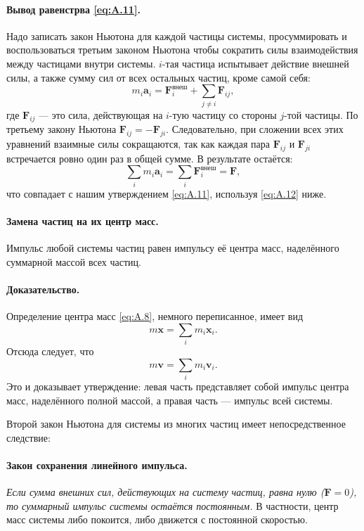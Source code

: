 \paragraph{Вывод равенстрва \eqref{eq:A.11}.}
Надо записать закон Ньютона для каждой частицы системы, просуммировать и воспользоваться
третьим законом Ньютона чтобы сократить силы взаимодействия между частицами внутри системы.
$i$-тая частица испытывает действие внешней силы, а также сумму сил от всех остальных частиц, кроме самой себя:
\[
m_i \mathbf{a}_i = \mathbf{F}_i^{\text{внеш}} + \sum_{j \neq i} \mathbf{F}_{ij},
\]
где $\mathbf{F}_{ij}$ — это сила, действующая на $i$-тую частицу
со стороны $j$-той частицы.
По третьему закону Ньютона $\mathbf{F}_{ij} = -\mathbf{F}_{ji}$.
Следовательно, при сложении всех этих уравнений взаимные силы
сокращаются, так как каждая пара $\mathbf{F}_{ij}$ и $\mathbf{F}_{ji}$
встречается ровно один раз в общей сумме.
В результате остаётся:
\[
\sum_i m_i \mathbf{a}_i = \sum_i \mathbf{F}_i^{\text{внеш}} = \mathbf{F},
\]
что совпадает с нашим утверждением \eqref{eq:A.11}, используя \eqref{eq:A.12} ниже.

\paragraph{Замена частиц на их центр масс.}
Импульс любой системы частиц равен импульсу её центра масс, наделённого суммарной массой всех частиц.

\paragraph{Доказательство.}
Определение центра масс \eqref{eq:A.8}, немного
переписанное, имеет вид
\begin{equation}
    m \mathbf{x} = \sum_i m_i \mathbf{x}_i.
    \label{eq:A.12}
\end{equation}
Отсюда следует, что
\[
m \mathbf{v} = \sum_i m_i \mathbf{v}_i.
\]
Это и доказывает утверждение: левая часть представляет собой импульс центра масс, наделённого полной массой,
а правая часть — импульс всей системы.

Второй закон Ньютона для системы из многих частиц имеет непосредственное следствие:

\paragraph{Закон сохранения линейного импульса.} \emph{Если сумма внешних сил, действующих на систему частиц, равна нулю ($\mathbf{F} = 0$), то суммарный импульс системы остаётся постоянным.}
В частности, центр масс системы либо покоится, либо движется с постоянной скоростью.
\label{Импульс:end}

